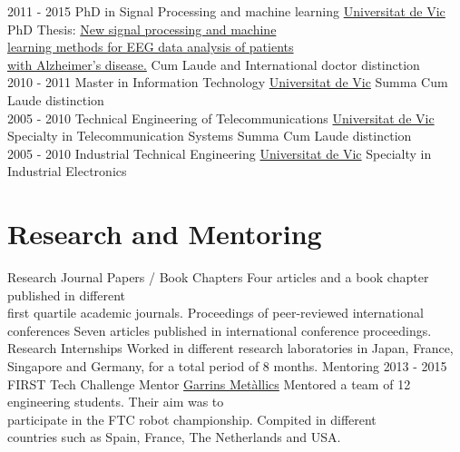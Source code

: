 \documentclass[letterpaper]{DS_class_file} %
\begin{document}
\begin{twenty} %
	\twentyitem
    	{2011 - 2015}
        {}
        {PhD in Signal Processing and  machine learning}
        {\href{https://www.uvic.cat/}{Universitat de Vic}}
        {PhD Thesis: \href{http://www.tdx.cat/handle/10803/290853}{New signal processing and machine \\ learning methods for EEG data analysis of patients \\ with Alzheimer's disease.}}
        {Cum Laude and International doctor distinction}
        \\
	\twentyitem
		{2010 - 2011}
		{}
		{Master in Information Technology}
		{\href{https://www.uvic.cat/}{Universitat de Vic}}
		{}
		{Summa Cum Laude distinction}
		\\
	\twentyitem
		{2005 - 2010}
		{}
		{Technical Engineering of Telecommunications}
		{\href{https://www.uvic.cat/}{Universitat de Vic}}
		{Specialty in Telecommunication Systems}
		{Summa Cum Laude distinction}
		\\
	\twentyitem
		{2005 - 2010}
		{}
		{Industrial Technical Engineering}
		{\href{https://www.uvic.cat/}{Universitat de Vic}}
		{Specialty in Industrial Electronics}
		{}
\end{twenty}



\vspace{-2mm}
\section{Research and Mentoring}

\begin{twenty} %
	\twentyitem
	{Research}
	{}
	{Journal Papers / Book Chapters}
	{}
	{Four articles and a book chapter published in different \\ first quartile academic journals.}
	{}
	\twentyitem
	{}
	{}
	{Proceedings of peer-reviewed international conferences}
	{}
	{Seven articles published in international conference proceedings.}
	{}
	\twentyitem
	{}
	{}
	{Research Internships}
	{}
	{Worked in different research laboratories in Japan, France,\\Singapore  and Germany, for a total period of 8 months.}
	{}
	\twentyitem
	{Mentoring}
	{2013 - 2015}
	{FIRST Tech Challenge Mentor}
	{\href{https://twitter.com/garrinsmetalics?lang=ca}{Garrins Met\`{a}l\cdot lics}}
	{Mentored a team of 12 engineering students. Their aim was to \\participate in the FTC robot championship. Compited in different \\countries such as Spain, France, The Netherlands and USA.}
	{}
	\\
\end{twenty}
\end{document}

